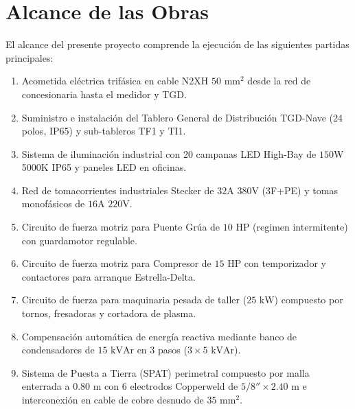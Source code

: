 \section{Alcance de las Obras}
El alcance del presente proyecto comprende la ejecución de las siguientes partidas principales:
\begin{enumerate}
    \item Acometida eléctrica trifásica en cable N2XH $50\text{ mm}^2$ desde la red de concesionaria hasta el medidor y TGD.
    \item Suministro e instalación del Tablero General de Distribución TGD-Nave (24 polos, IP65) y sub-tableros TF1 y TI1.
    \item Sistema de iluminación industrial con 20 campanas LED High-Bay de $150\text{W}$ 5000K IP65 y paneles LED en oficinas.
    \item Red de tomacorrientes industriales Stecker de $32\text{A}$ $380\text{V}$ (3F+PE) y tomas monofásicos de $16\text{A}$ $220\text{V}$.
    \item Circuito de fuerza motriz para Puente Grúa de $10\text{ HP}$ (regimen intermitente) con guardamotor regulable.
    \item Circuito de fuerza motriz para Compresor de $15\text{ HP}$ con temporizador y contactores para arranque Estrella-Delta.
    \item Circuito de fuerza para maquinaria pesada de taller ($25\text{ kW}$) compuesto por tornos, fresadoras y cortadora de plasma.
    \item Compensación automática de energía reactiva mediante banco de condensadores de $15\text{ kVAr}$ en 3 pasos ($3 \times 5\text{ kVAr}$).
    \item Sistema de Puesta a Tierra (SPAT) perimetral compuesto por malla enterrada a $0.80\text{ m}$ con 6 electrodos Copperweld de $5/8'' \times 2.40\text{ m}$ e interconexión en cable de cobre desnudo de $35\text{ mm}^2$.
\end{enumerate}

